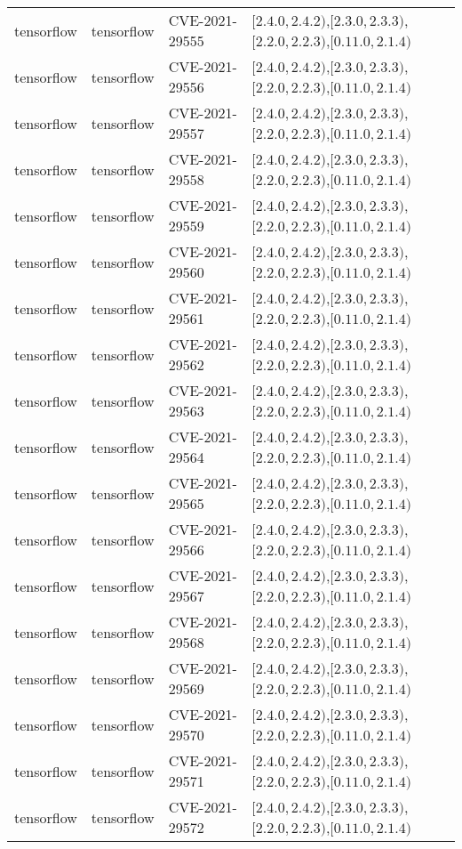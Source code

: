 \begin{tabular}{llll}
tensorflow & tensorflow & CVE-2021-29555 & $[2.4.0,2.4.2)$,$[2.3.0,2.3.3)$,$[2.2.0,2.2.3)$,$[0.11.0,2.1.4)$ \\
tensorflow & tensorflow & CVE-2021-29556 & $[2.4.0,2.4.2)$,$[2.3.0,2.3.3)$,$[2.2.0,2.2.3)$,$[0.11.0,2.1.4)$ \\
tensorflow & tensorflow & CVE-2021-29557 & $[2.4.0,2.4.2)$,$[2.3.0,2.3.3)$,$[2.2.0,2.2.3)$,$[0.11.0,2.1.4)$ \\
tensorflow & tensorflow & CVE-2021-29558 & $[2.4.0,2.4.2)$,$[2.3.0,2.3.3)$,$[2.2.0,2.2.3)$,$[0.11.0,2.1.4)$ \\
tensorflow & tensorflow & CVE-2021-29559 & $[2.4.0,2.4.2)$,$[2.3.0,2.3.3)$,$[2.2.0,2.2.3)$,$[0.11.0,2.1.4)$ \\
tensorflow & tensorflow & CVE-2021-29560 & $[2.4.0,2.4.2)$,$[2.3.0,2.3.3)$,$[2.2.0,2.2.3)$,$[0.11.0,2.1.4)$ \\
tensorflow & tensorflow & CVE-2021-29561 & $[2.4.0,2.4.2)$,$[2.3.0,2.3.3)$,$[2.2.0,2.2.3)$,$[0.11.0,2.1.4)$ \\
tensorflow & tensorflow & CVE-2021-29562 & $[2.4.0,2.4.2)$,$[2.3.0,2.3.3)$,$[2.2.0,2.2.3)$,$[0.11.0,2.1.4)$ \\
tensorflow & tensorflow & CVE-2021-29563 & $[2.4.0,2.4.2)$,$[2.3.0,2.3.3)$,$[2.2.0,2.2.3)$,$[0.11.0,2.1.4)$ \\
tensorflow & tensorflow & CVE-2021-29564 & $[2.4.0,2.4.2)$,$[2.3.0,2.3.3)$,$[2.2.0,2.2.3)$,$[0.11.0,2.1.4)$ \\
tensorflow & tensorflow & CVE-2021-29565 & $[2.4.0,2.4.2)$,$[2.3.0,2.3.3)$,$[2.2.0,2.2.3)$,$[0.11.0,2.1.4)$ \\
tensorflow & tensorflow & CVE-2021-29566 & $[2.4.0,2.4.2)$,$[2.3.0,2.3.3)$,$[2.2.0,2.2.3)$,$[0.11.0,2.1.4)$ \\
tensorflow & tensorflow & CVE-2021-29567 & $[2.4.0,2.4.2)$,$[2.3.0,2.3.3)$,$[2.2.0,2.2.3)$,$[0.11.0,2.1.4)$ \\
tensorflow & tensorflow & CVE-2021-29568 & $[2.4.0,2.4.2)$,$[2.3.0,2.3.3)$,$[2.2.0,2.2.3)$,$[0.11.0,2.1.4)$ \\
tensorflow & tensorflow & CVE-2021-29569 & $[2.4.0,2.4.2)$,$[2.3.0,2.3.3)$,$[2.2.0,2.2.3)$,$[0.11.0,2.1.4)$ \\
tensorflow & tensorflow & CVE-2021-29570 & $[2.4.0,2.4.2)$,$[2.3.0,2.3.3)$,$[2.2.0,2.2.3)$,$[0.11.0,2.1.4)$ \\
tensorflow & tensorflow & CVE-2021-29571 & $[2.4.0,2.4.2)$,$[2.3.0,2.3.3)$,$[2.2.0,2.2.3)$,$[0.11.0,2.1.4)$ \\
tensorflow & tensorflow & CVE-2021-29572 & $[2.4.0,2.4.2)$,$[2.3.0,2.3.3)$,$[2.2.0,2.2.3)$,$[0.11.0,2.1.4)$ \\

\end{tabular}
